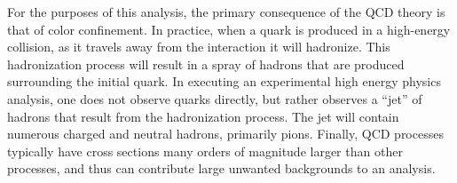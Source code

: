 For the purposes of this analysis, the primary consequence of the QCD theory is that of color confinement.
In practice, when a quark is produced in a high-energy collision, as it travels away from the interaction it will hadronize.
This hadronization process will result in a spray of hadrons that are produced surrounding the initial quark.
In executing an experimental high energy physics analysis, one does not observe quarks directly, but rather observes a ``jet'' of hadrons that result from the hadronization process.
The jet will contain numerous charged and neutral hadrons, primarily pions. 
Finally, QCD processes typically have cross sections many orders of magnitude larger than other processes, and thus can contribute large unwanted backgrounds to an analysis. 





